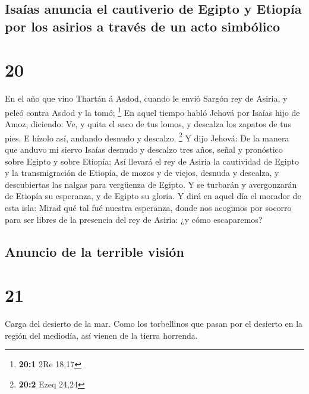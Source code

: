 \hypertarget{isauxedas-anuncia-el-cautiverio-de-egipto-y-etiopuxeda-por-los-asirios-a-travuxe9s-de-un-acto-simbuxf3lico}{%
\subsection{Isaías anuncia el cautiverio de Egipto y Etiopía por los
asirios a través de un acto
simbólico}\label{isauxedas-anuncia-el-cautiverio-de-egipto-y-etiopuxeda-por-los-asirios-a-travuxe9s-de-un-acto-simbuxf3lico}}

\hypertarget{section-19}{%
\section{20}\label{section-19}}

 En el año que vino Thartán á Asdod, cuando le envió
Sargón rey de Asiria, y peleó contra Asdod y la tomó; \footnote{\textbf{20:1}
  2Re 18,17}  En aquel tiempo habló Jehová por Isaías hijo
de Amoz, diciendo: Ve, y quita el saco de tus lomos, y descalza los
zapatos de tus pies. E hízolo así, andando desnudo y descalzo.
\footnote{\textbf{20:2} Ezeq 24,24}  Y dijo Jehová: De la
manera que anduvo mi siervo Isaías desnudo y descalzo tres años, señal y
pronóstico sobre Egipto y sobre Etiopía;  Así llevará el
rey de Asiria la cautividad de Egipto y la transmigración de Etiopía, de
mozos y de viejos, desnuda y descalza, y descubiertas las nalgas para
vergüenza de Egipto.  Y se turbarán y avergonzarán de
Etiopía su esperanza, y de Egipto su gloria.  Y dirá en
aquel día el morador de esta isla: Mirad qué tal fué nuestra esperanza,
donde nos acogimos por socorro para ser libres de la presencia del rey
de Asiria: ¿y cómo escaparemos?

\hypertarget{anuncio-de-la-terrible-visiuxf3n}{%
\subsection{Anuncio de la terrible
visión}\label{anuncio-de-la-terrible-visiuxf3n}}

\hypertarget{section-20}{%
\section{21}\label{section-20}}

 Carga del desierto de la mar. Como los torbellinos que
pasan por el desierto en la región del mediodía, así vienen de la tierra
horrenda.

